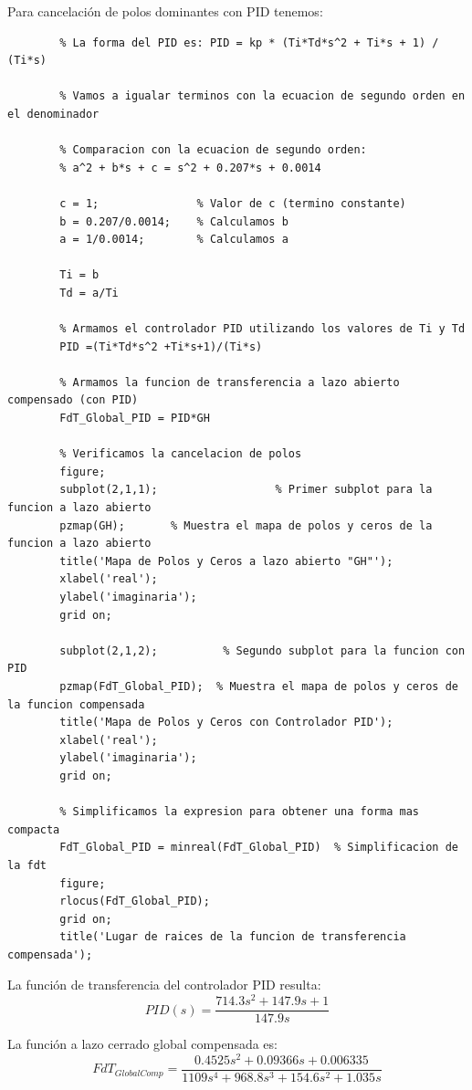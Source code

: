 \documentclass[12pt]{article}
\begin{document}
	Para cancelación de polos dominantes con PID tenemos:
	\begin{lstlisting}
		% La forma del PID es: PID = kp * (Ti*Td*s^2 + Ti*s + 1) / (Ti*s)
		
		% Vamos a igualar terminos con la ecuacion de segundo orden en el denominador
		
		% Comparacion con la ecuacion de segundo orden:
		% a^2 + b*s + c = s^2 + 0.207*s + 0.0014
		
		c = 1;               % Valor de c (termino constante)
		b = 0.207/0.0014;    % Calculamos b
		a = 1/0.0014;        % Calculamos a
		
		Ti = b
		Td = a/Ti
		
		% Armamos el controlador PID utilizando los valores de Ti y Td
		PID =(Ti*Td*s^2 +Ti*s+1)/(Ti*s)
		
		% Armamos la funcion de transferencia a lazo abierto compensado (con PID)
		FdT_Global_PID = PID*GH
		
		% Verificamos la cancelacion de polos
		figure;
		subplot(2,1,1);                  % Primer subplot para la funcion a lazo abierto
		pzmap(GH);       % Muestra el mapa de polos y ceros de la funcion a lazo abierto
		title('Mapa de Polos y Ceros a lazo abierto "GH"');
		xlabel('real');
		ylabel('imaginaria');
		grid on;
		
		subplot(2,1,2);          % Segundo subplot para la funcion con PID
		pzmap(FdT_Global_PID);  % Muestra el mapa de polos y ceros de la funcion compensada
		title('Mapa de Polos y Ceros con Controlador PID');
		xlabel('real');
		ylabel('imaginaria');
		grid on;
		
		% Simplificamos la expresion para obtener una forma mas compacta
		FdT_Global_PID = minreal(FdT_Global_PID)  % Simplificacion de la fdt
		figure;
		rlocus(FdT_Global_PID);
		grid on;
		title('Lugar de raices de la funcion de transferencia compensada');
	\end{lstlisting}
	
	La función de transferencia del controlador PID resulta:
	\begin{equation}
		PID(s)=\frac{714.3s^2 + 147.9s + 1}{147.9s}
	\end{equation}
	
	La función a lazo cerrado global compensada es:
	\begin{equation}
		FdT_{GlobalComp}=\frac{0.4525s^2 + 0.09366s + 0.006335}{1109s^4 + 968.8s^3 + 154.6s^2 + 1.035s}
	\end{equation}
	
\end{document}
